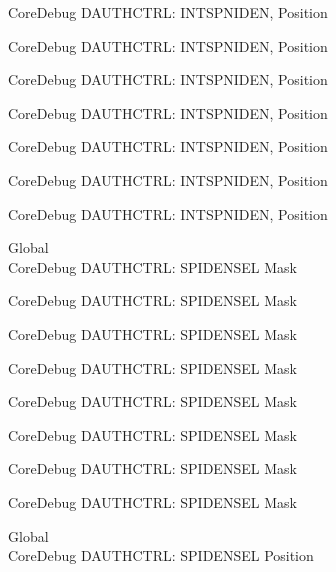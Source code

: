 \begin{DoxyRefList}
\label{deprecated__deprecated000139}%
%
Core\+Debug DAUTHCTRL\+: INTSPNIDEN, Position 

\label{deprecated__deprecated000215}%
%
Core\+Debug DAUTHCTRL\+: INTSPNIDEN, Position 

\label{deprecated__deprecated000278}%
%
Core\+Debug DAUTHCTRL\+: INTSPNIDEN, Position 

\label{deprecated__deprecated000357}%
%
Core\+Debug DAUTHCTRL\+: INTSPNIDEN, Position 

\label{deprecated__deprecated000433}%
%
Core\+Debug DAUTHCTRL\+: INTSPNIDEN, Position 

\label{deprecated__deprecated000536}%
%
Core\+Debug DAUTHCTRL\+: INTSPNIDEN, Position 

\label{deprecated__deprecated000638}%
%
Core\+Debug DAUTHCTRL\+: INTSPNIDEN, Position  
\item[Global \doxylink{group___c_m_s_i_s___s_c_b_gaa043fd13768d57be320c682ca1c9b234}{Core\+Debug\+\_\+\+DAUTHCTRL\+\_\+\+SPIDENSEL\+\_\+\+Msk} ]\hfill \\
\label{deprecated__deprecated000092}%
%
Core\+Debug DAUTHCTRL\+: SPIDENSEL Mask 

\label{deprecated__deprecated000146}%
%
Core\+Debug DAUTHCTRL\+: SPIDENSEL Mask 

\label{deprecated__deprecated000222}%
%
Core\+Debug DAUTHCTRL\+: SPIDENSEL Mask 

\label{deprecated__deprecated000285}%
%
Core\+Debug DAUTHCTRL\+: SPIDENSEL Mask 

\label{deprecated__deprecated000364}%
%
Core\+Debug DAUTHCTRL\+: SPIDENSEL Mask 

\label{deprecated__deprecated000440}%
%
Core\+Debug DAUTHCTRL\+: SPIDENSEL Mask 

\label{deprecated__deprecated000543}%
%
Core\+Debug DAUTHCTRL\+: SPIDENSEL Mask 

\label{deprecated__deprecated000645}%
%
Core\+Debug DAUTHCTRL\+: SPIDENSEL Mask  
\item[Global \doxylink{group___c_m_s_i_s___s_c_b_ga587610b7ac18292de47bf9d675b0b88c}{Core\+Debug\+\_\+\+DAUTHCTRL\+\_\+\+SPIDENSEL\+\_\+\+Pos} ]\hfill \\
\label{deprecated__deprecated000091}%
%
Core\+Debug DAUTHCTRL\+: SPIDENSEL Position 


\end{DoxyRefList}
